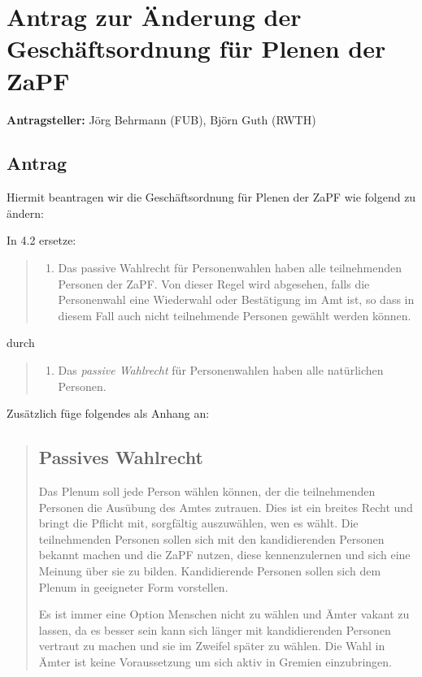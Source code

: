 \documentclass[draft,10pt,oneside]{scrartcl}
\begin{document}
\section*{Antrag zur Änderung der Geschäftsordnung für Plenen der ZaPF}

\textbf{Antragsteller:} Jörg Behrmann (FUB), Björn Guth (RWTH)

\subsection*{Antrag}

Hiermit beantragen wir die Geschäftsordnung für Plenen der ZaPF wie folgend zu
ändern:

In 4.2 ersetze:
\begin{quote}
    \begin{enumerate}
        \item Das passive Wahlrecht für Personenwahlen haben alle teilnehmenden
            Personen der ZaPF. Von dieser Regel wird abgesehen, falls die
            Personenwahl eine Wiederwahl oder Bestätigung im Amt ist, so dass
            in diesem Fall auch nicht teilnehmende Personen gewählt werden
            können.
    \end{enumerate}
\end{quote}
durch
\begin{quote}
    \begin{enumerate}
        \item Das \textit{passive Wahlrecht} für Personenwahlen haben alle
            natürlichen Personen.
    \end{enumerate}
\end{quote}
Zusätzlich füge folgendes als Anhang an:
\begin{quote}
    \subsection*{Passives Wahlrecht}

    Das Plenum soll jede Person wählen können, der die teilnehmenden Personen
    die Ausübung des Amtes zutrauen. Dies ist ein breites Recht und bringt die
    Pflicht mit, sorgfältig auszuwählen, wen es wählt. Die teilnehmenden
    Personen sollen sich mit den kandidierenden Personen bekannt machen und die
    ZaPF nutzen, diese kennenzulernen und sich eine Meinung über sie zu bilden.
    Kandidierende Personen sollen sich dem Plenum in geeigneter Form
    vorstellen.

    Es ist immer eine Option Menschen nicht zu wählen und Ämter vakant zu
    lassen, da es besser sein kann sich länger mit kandidierenden Personen
    vertraut zu machen und sie im Zweifel später zu wählen. Die Wahl in Ämter
    ist keine Voraussetzung um sich aktiv in Gremien einzubringen.
\end{quote}
\end{document}
